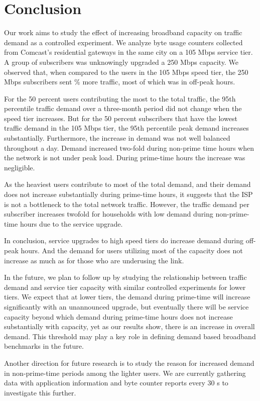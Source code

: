 \section{Conclusion}\label{sec:conclusion}

Our work aims to study the effect of increasing broadband capacity on traffic
demand as a controlled experiment. We analyze byte usage counters collected
from Comcast's residential gateways in the same city on a 105 Mbps service
tier. A group of subscribers was unknowingly upgraded a 250 Mbps capacity.
We observed that, when compared to the users in the 105 Mbps speed tier,
the 250 Mbps subscribers sent \% more traffic, most of which was in 
off-peak hours.

For the 50 percent users contributing the most to the total traffic, the 95th
percentile traffic demand over a three-month period did not change when the
speed tier increases. But for the 50 percent subscribers that have the lowest
traffic demand in the 105 Mbps tier, the 95th percentile peak demand increases
substantially. Furthermore, the increase in demand was not well balanced 
throughout
a day. Demand increased two-fold during non-prime time hours when the network is 
not
under peak load. During prime-time hours the increase was negligible.

As the heaviest users contribute to most of the total demand, and their demand 
does not increase substantially during prime-time hours, it suggests that the 
ISP is not a bottleneck to the total network traffic. However, the traffic 
demand
per subscriber increases twofold for households with low demand during 
non-prime-time
hours due to the service upgrade.

In conclusion, service upgrades to high speed tiers do increase demand during 
off-peak
hours. And the demand for users utilizing most of the capacity does not increase
as much as for those who are underusing the link. 

In the future, we plan to follow
up by studying the relationship between traffic demand and service tier
capacity with similar controlled experiments for lower tiers. 
We expect that at lower tiers, the demand during prime-time will increase 
significantly with an unannounced upgrade, but eventually there will be
service capacity beyond which demand during prime-time hours does not
increase substantially with capacity, yet as our results show, there is an 
increase in overall demand. This threshold may play a key role in defining
demand based broadband benchmarks in the future.

Another direction for future research is to study the reason for increased 
demand in non-prime-time periods among the lighter users. We are currently 
gathering data with application information and byte counter reports every 30 s 
to investigate this further.